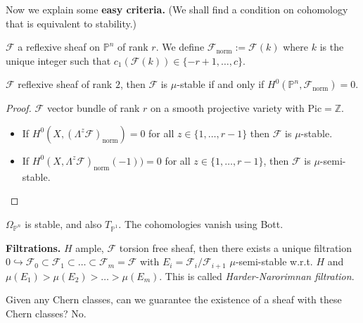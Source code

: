 Now we explain some {\bf easy criteria.} (We
shall find a condition on cohomology that is
equivalent to stability.)

\begin{definition}
\label{definition-norm-sheaf}
$\mathcal{F}$ a reflexive sheaf on
$\mathbb{P}^n$ of rank $r$. We define
$\mathcal{F}_{\text{norm}}:=\mathcal{F}(k)$
where $k$ is the unique integer such that
$c_1(\mathcal{F}(k))\in \{-r+1,\ldots,c\}$.
\end{definition}

\begin{proposition}
\label{msos-label-006}
$\mathcal{F}$ reflexive sheaf of rank  $2$,
then $\mathcal{F}$ is $\mu$-stable if and
only if
$H^{0}(\mathbb{P}^n,\mathcal{F}_{\text{norm}}
)
=0$.
\end{proposition}

\begin{proof}
$\mathcal{F}$ vector bundle of rank $r$ on a
smooth projective variety with
$\text{Pic}=\mathbb{Z}$.
\begin{itemize}
\item If
$H^{0}(X,(\Lambda^{z}\mathcal{F})
_{\text{norm}
})=0$
for all $z \in
\{1,\ldots,r-1\}$ then $\mathcal{F}$ is
$\mu$-stable.
\item If
$H^{0}(X,\Lambda^{z}\mathcal{F})_{\text{norm}
}
(-1))=0$
for all $z \in
\{1,\ldots,r-1\}$, then $\mathcal{F}$ is
$\mu$-semi-stable.
\end{itemize}
\end{proof}

\begin{example}
\label{msos-label-007}
$\Omega_{\mathbb{P}^n}$ is stable, and also
$T_{\mathbb{P}^1}$. The cohomologies vanish
using Bott.
\end{example}

\begin{example}
\label{example-lots-of-Os}

\end{example}

{\bf Filtrations.} $H$ ample, $\mathcal{F}$
torsion free sheaf, then there exists a
unique filtration $0 \hookrightarrow
\mathcal{F}_0\subset
\mathcal{F}_1\subset\ldots\subset\mathcal{F}
_m=\mathcal{F}$
with
$E_i=\mathcal{F}_i/\mathcal{F}_{i+1}$
$\mu$-semi-stable w.r.t. $H$ and
$\mu(E_1)>\mu(E_2)>\ldots>\mu(E_m)$. This is
called {\it Harder-Narorimnan filtration}.

Given any Chern classes, can we guarantee the
existence of a sheaf with these Chern
classes? No.

